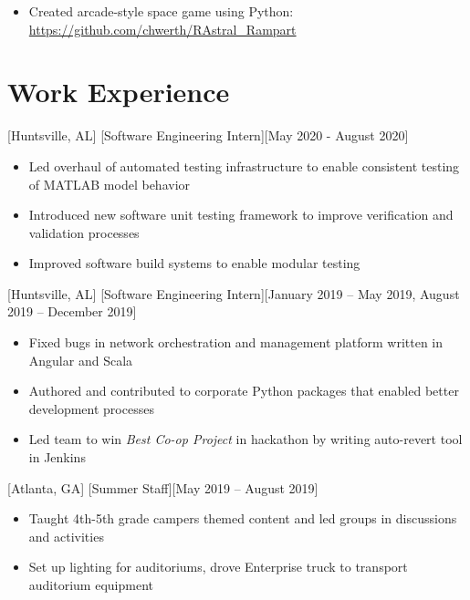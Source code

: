 \documentclass[hidelinks, 11pt]{article}
\newcommand{\link}[1]{{\color{blue}\href{#1}{#1}}}
\begin{document}
		\begin{itemize}
			\item Created arcade-style space game using Python: \link{https://github.com/chwerth/RAstral\_Rampart}
		\end{itemize}\leavevmode
	
	\section{Work Experience}
	
		[Huntsville, AL]
		[Software Engineering Intern][May 2020 - August 2020]
	
			\begin{itemize}
				\item Led overhaul of automated testing infrastructure to enable consistent testing of MATLAB model behavior
				\item Introduced new software unit testing framework to improve verification and validation processes
				\item Improved software build systems to enable modular testing
			\end{itemize}\leavevmode
	
		[Huntsville, AL]
		[Software Engineering Intern][January 2019 – May 2019, August 2019 – December 2019]
	
			\begin{itemize}
				\item Fixed bugs in network orchestration and management platform written in Angular and Scala
				\item Authored and contributed to corporate Python packages that enabled better development processes
				\item Led team to win \textit{Best Co-op Project} in hackathon by writing auto-revert tool in Jenkins
			\end{itemize}\leavevmode
	
		[Atlanta, GA]
		[Summer Staff][May 2019 – August 2019]
		
			\begin{itemize}
				\item Taught 4th-5th grade campers themed content and led groups in discussions and activities
				\item Set up lighting for auditoriums, drove Enterprise truck to transport auditorium equipment
			\end{itemize}\leavevmode
		
\end{document}
